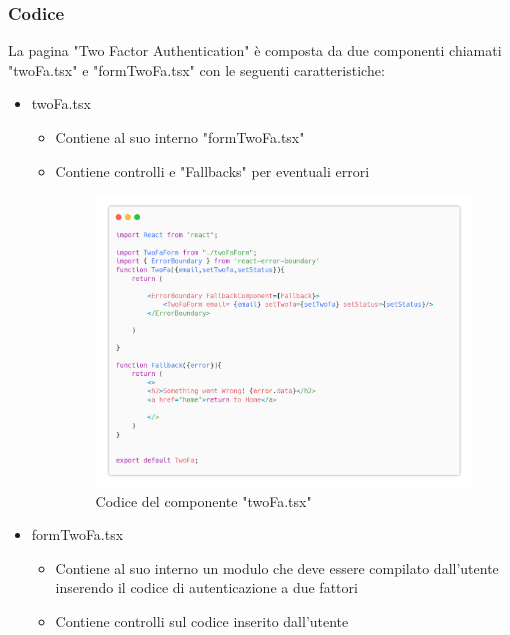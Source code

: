 \documentclass{report}
\begin{document}
\subsubsection*{Codice}
La pagina "Two Factor Authentication" è composta da due componenti chiamati "twoFa.tsx" e "formTwoFa.tsx" con le seguenti caratteristiche:
\begin{itemize}
	\item twoFa.tsx
	\begin{itemize}
		\item Contiene al suo interno "formTwoFa.tsx"
		\item Contiene controlli e "Fallbacks" per eventuali errori
		\begin{figure}[H]
			\centering\includegraphics[width=1\textwidth]{images/microservizio-autenticazione/frontend/twoFa-carbon.png}
			Codice del componente "twoFa.tsx"
		\end{figure}
	\end{itemize}
	\item formTwoFa.tsx
	\begin{itemize}
		\item Contiene al suo interno un modulo che deve essere compilato dall'utente inserendo il codice di autenticazione a due fattori
		\item Contiene controlli sul codice inserito dall'utente
		\begin{figure}[H]

\end{figure}
\end{itemize}
\end{itemize}
\end{document}
